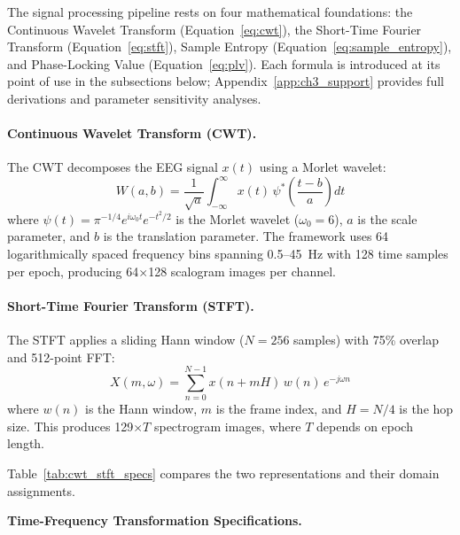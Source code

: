 
The signal processing pipeline rests on four mathematical foundations: the Continuous Wavelet Transform (Equation~\ref{eq:cwt}), the Short-Time Fourier Transform (Equation~\ref{eq:stft}), Sample Entropy (Equation~\ref{eq:sample_entropy}), and Phase-Locking Value (Equation~\ref{eq:plv}). Each formula is introduced at its point of use in the subsections below; Appendix~\ref{app:ch3_support} provides full derivations and parameter sensitivity analyses.

\paragraph{Continuous Wavelet Transform (CWT).}
The CWT decomposes the EEG signal $x(t)$ using a Morlet wavelet:
\begin{equation}
W(a,b) = \frac{1}{\sqrt{a}} \int_{-\infty}^{\infty} x(t) \, \psi^{*}\!\left(\frac{t-b}{a}\right) dt
\end{equation}
where $\psi(t) = \pi^{-1/4} e^{i\omega_0 t} e^{-t^2/2}$ is the Morlet wavelet ($\omega_0 = 6$), $a$ is the scale parameter, and $b$ is the translation parameter. The framework uses 64 logarithmically spaced frequency bins spanning 0.5--45~Hz with 128 time samples per epoch, producing 64$\times$128 scalogram images per channel.

\paragraph{Short-Time Fourier Transform (STFT).}
The STFT applies a sliding Hann window ($N = 256$ samples) with 75\% overlap and 512-point FFT:
\begin{equation}
X(m, \omega) = \sum_{n=0}^{N-1} x(n + mH) \, w(n) \, e^{-j\omega n}
\end{equation}
where $w(n)$ is the Hann window, $m$ is the frame index, and $H = N/4$ is the hop size. This produces 129$\times T$ spectrogram images, where $T$ depends on epoch length.

Table~\ref{tab:cwt_stft_specs} compares the two representations and their domain assignments.


\noindent\textbf{Time-Frequency Transformation Specifications.}

